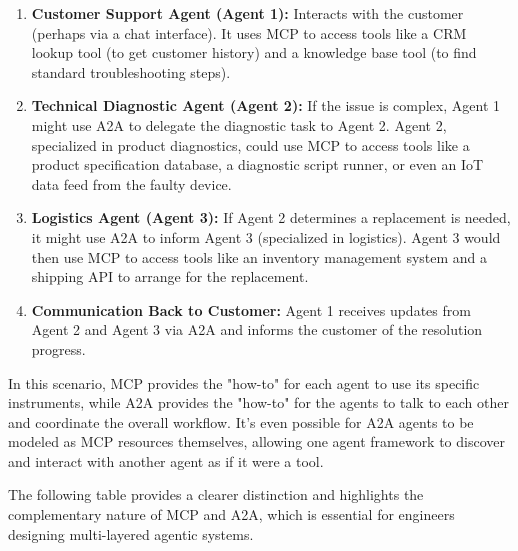 \begin{enumerate}[label=\arabic*.]
    \item \textbf{Customer Support Agent (Agent 1):} Interacts with the customer (perhaps via a chat interface). 
    It uses MCP to access tools like a CRM lookup tool (to get customer history) and a knowledge base tool (to find standard troubleshooting steps).
    \item \textbf{Technical Diagnostic Agent (Agent 2):} If the issue is complex, Agent 1 might use A2A to delegate the diagnostic task to Agent 2. 
    Agent 2, specialized in product diagnostics, could use MCP to access tools like a product specification database, a diagnostic script runner, 
    or even an IoT data feed from the faulty device.
    \item \textbf{Logistics Agent (Agent 3):} If Agent 2 determines a replacement is needed, it might use A2A to inform Agent 3 (specialized in logistics). 
    Agent 3 would then use MCP to access tools like an inventory management system and a shipping API to arrange for the replacement.
    \item \textbf{Communication Back to Customer:} Agent 1 receives updates from Agent 2 and Agent 3 via A2A and informs the customer of the resolution progress.
\end{enumerate}

In this scenario, MCP provides the "how-to" for each agent to use its specific instruments, while A2A provides the "how-to" for the agents to talk
 to each other and coordinate the overall workflow. It's even possible for A2A agents to be modeled as MCP resources themselves,
  allowing one agent framework to discover and interact with another agent as if it were a tool.

The following table provides a clearer distinction and highlights the complementary nature of MCP and A2A, which is essential for 
engineers designing multi-layered agentic systems.

